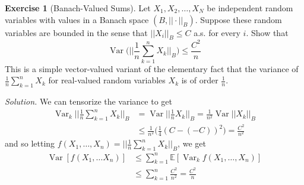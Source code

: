 \documentclass{article}
\DeclareMathOperator{\Var}{Var}
\theoremstyle{definition}
\newtheorem{exercise}{Exercise}[section]
\theoremstyle{remark}
\theoremstyle{definition}
\newenvironment{solution}{\noindent \textit{Solution.}}{}
\begin{document}
\begin{exercise}[Banach-Valued Sums]
Let $X_1, X_2, \ldots, X_N$ be independent random variables with values in a Banach space $(B, ||\cdot ||_B)$. Suppose these random variables are bounded in the sense that $||X_i||_B \leq C$ a.s. for every $i$. Show that 
\[\Var\bigg( \bigg| \bigg| \frac{1}{n} \sum_{k=1}^n X_k \bigg| \bigg|_B \bigg) \leq \frac{C^2}{n}\]
This is a simple vector-valued variant of the elementary fact that the variance of $\frac{1}{n} \sum_{k=1}^n X_k$ for real-valued random variables $X_k$ is of order $\frac{1}{n}$. 
\end{exercise}
\begin{solution}
We can tensorize the variance to get 
\begin{align*}
    \Var_k \bigg| \bigg| \frac{1}{n} \sum_{k=1}^n X_k \bigg| \bigg|_B & = \Var \bigg| \bigg| \frac{1}{n} X_k \bigg| \bigg|_B = \frac{1}{n^2} \Var ||X_k||_B \\
    & \leq \frac{1}{n^2} \bigg( \frac{1}{4} (C - (-C))^2 \bigg) = \frac{C^2}{n^2} 
\end{align*}
and so letting $f(X_1, \ldots, X_n) = \big| \big| \frac{1}{n} \sum_{k=1}^n X_k \big| \big|_B$, we get 
\begin{align*}
    \Var [f(X_1, \ldots X_n)] & \leq \sum_{k=1}^n \mathbb{E}[ \Var_k f (X_1, \ldots, X_n)] \\
    & \leq \sum_{k=1}^n \frac{C^2}{n^2} = \frac{C^2}{n} 
\end{align*}
\end{solution}
\end{document}
